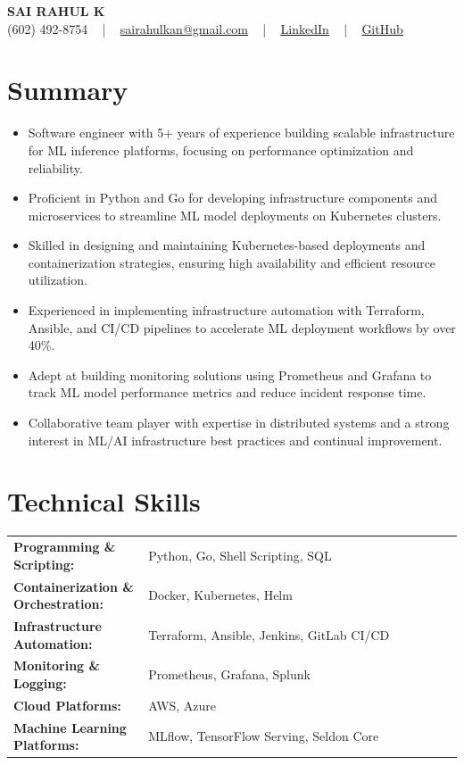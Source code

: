 \documentclass[letterpaper,11pt]{article}
\newcommand{\resumeItem}[1]{
  \item\footnotesize{
    {#1 \vspace{-2pt}}
  }
}
\newcommand{\resumeItemListStart}{\begin{itemize}[leftmargin=*]}
\newcommand{\resumeItemListEnd}{\end{itemize}\vspace{-5pt}}
\begin{document}
\begin{center}
    {\fontsize{14pt}{12pt}\selectfont \textbf{\MakeUppercase{Sai Rahul K}}}\\ \vspace{2pt}
    \fontsize{10pt}{12pt}\selectfont (602) 492-8754 ~ | ~ \href{mailto:sairahulkan@gmail.com}{sairahulkan@gmail.com} ~ | ~
    \href{https://www.linkedin.com/in/rq123/}{\color{blue}\underline{LinkedIn}} ~ | ~
    \href{https://github.com/kanrahuldo}{\color{blue}\underline{GitHub}}~
    \vspace{-8pt}
\end{center}

\section{Summary}
\fontsize{9pt}{10pt}\selectfont
\resumeItemListStart
    \resumeItem{Software engineer with 5+ years of experience building scalable infrastructure for ML inference platforms, focusing on performance optimization and reliability.}
    \resumeItem{Proficient in Python and Go for developing infrastructure components and microservices to streamline ML model deployments on Kubernetes clusters.}
    \resumeItem{Skilled in designing and maintaining Kubernetes-based deployments and containerization strategies, ensuring high availability and efficient resource utilization.}
    \resumeItem{Experienced in implementing infrastructure automation with Terraform, Ansible, and CI/CD pipelines to accelerate ML deployment workflows by over 40\%.}
    \resumeItem{Adept at building monitoring solutions using Prometheus and Grafana to track ML model performance metrics and reduce incident response time.}
    \resumeItem{Collaborative team player with expertise in distributed systems and a strong interest in ML/AI infrastructure best practices and continual improvement.}
\resumeItemListEnd
\vspace{-6pt}

\section{Technical Skills}
        \vspace{-14pt}
        \begin{tabular}{p{0.3\linewidth} p{0.7\linewidth}}
                \textbf{Programming \& Scripting:} & Python, Go, Shell Scripting, SQL \\
                \textbf{Containerization \& Orchestration:} & Docker, Kubernetes, Helm \\
                \textbf{Infrastructure Automation:} & Terraform, Ansible, Jenkins, GitLab CI/CD \\
                \textbf{Monitoring \& Logging:} & Prometheus, Grafana, Splunk \\
                \textbf{Cloud Platforms:} & AWS, Azure \\
                \textbf{Machine Learning Platforms:} & MLflow, TensorFlow Serving, Seldon Core \\
        \end{tabular}
    \vspace{-15pt}
\end{document}
